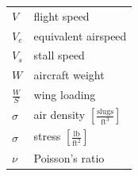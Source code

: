 \documentclass[
]{book}
\begin{document}
\begin{longtable}[]{@{}ll@{}}
\begin{minipage}[t]{0.14\columnwidth}
\(V\)\strut
\end{minipage} & \begin{minipage}[t]{0.80\columnwidth}\raggedright
flight speed\strut
\end{minipage}\tabularnewline
\begin{minipage}[t]{0.14\columnwidth}\raggedright
\(V_e\)\strut
\end{minipage} & \begin{minipage}[t]{0.80\columnwidth}\raggedright
equivalent airspeed\strut
\end{minipage}\tabularnewline
\begin{minipage}[t]{0.14\columnwidth}\raggedright
\(V_s\)\strut
\end{minipage} & \begin{minipage}[t]{0.80\columnwidth}\raggedright
stall speed\strut
\end{minipage}\tabularnewline
\begin{minipage}[t]{0.14\columnwidth}\raggedright
\(W\)\strut
\end{minipage} & \begin{minipage}[t]{0.80\columnwidth}\raggedright
aircraft weight\strut
\end{minipage}\tabularnewline
\begin{minipage}[t]{0.14\columnwidth}\raggedright
\(\frac{W}{S}\)\strut
\end{minipage} & \begin{minipage}[t]{0.80\columnwidth}\raggedright
wing loading\strut
\end{minipage}\tabularnewline
\begin{minipage}[t]{0.14\columnwidth}\raggedright
\(\sigma\)\strut
\end{minipage} & \begin{minipage}[t]{0.80\columnwidth}\raggedright
air density \(\left[\frac{\text{slugs}}{\text{ft}^3}\right]\)\strut
\end{minipage}\tabularnewline
\begin{minipage}[t]{0.14\columnwidth}\raggedright
\(\sigma\)\strut
\end{minipage} & \begin{minipage}[t]{0.80\columnwidth}\raggedright
stress \(\left[\frac{\text{lb}}{\text{ft}^2}\right]\)\strut
\end{minipage}\tabularnewline
\begin{minipage}[t]{0.14\columnwidth}\raggedright
\(\nu\)\strut
\end{minipage} & \begin{minipage}[t]{0.80\columnwidth}\raggedright
Poisson's ratio\strut
\end{minipage}\tabularnewline
\bottomrule
\end{longtable}
\end{document}
